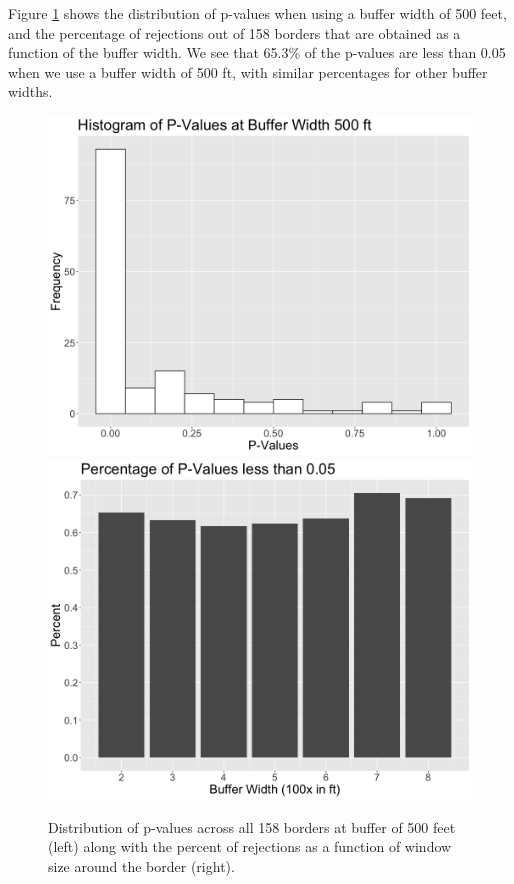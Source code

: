 \documentclass[a4paper,11pt]{article}
\begin{document}
Figure \ref{fig:NaivePvalue} shows the distribution of p-values when using a buffer width of 500 feet, and the percentage of rejections out of 158 borders that are obtained as a function of the buffer width. We see that 65.3\% of the p-values are less than 0.05 when we use a buffer width of 500 ft, with similar percentages for other buffer widths.
\begin{figure}[h]
    \centering
    \includegraphics[scale=0.2]{plots/UnadjPVal500.png}
    \includegraphics[scale=0.2]{plots/NumRejectByBuffer.png}
        \caption{Distribution of p-values across all 158 borders at buffer of 500 feet (left) along with the percent of rejections as a function of window size around the border (right).}
    \label{fig:NaivePvalue}
\end{figure}
\end{document}
